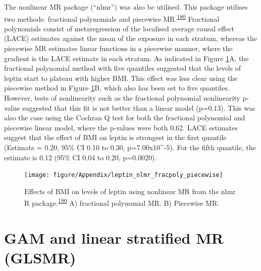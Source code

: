 \documentclass[11pt,twoside]{bristolthesis}
\begin{document}
The nonlinear MR package (``nlmr'') was also be utilised. This package utilises two methods: fractional polynomials and piecewise MR.\textsuperscript{\protect\hyperlink{ref-Staley2017}{180}} Fractional polynomials consist of metaregression of the localised average causal effect (LACE) estimates against the mean of the exposure in each stratum, whereas the piecewise MR estimates linear functions in a piecewise manner, where the gradient is the LACE estimate in each stratum. As indicated in Figure \ref{fig:leptin-nlmr}A, the fractional polynomial method with five quantiles suggested that the levels of leptin start to plateau with higher BMI. This effect was less clear using the piecewise method in Figure \ref{fig:leptin-nlmr}B, which also has been set to five quantiles. However, tests of nonlinearity such as the fractional polynomial nonlinearity p-value suggested that this fit is not better than a linear model (p=0.13). This was also the case using the Cochran Q test for both the fractional polynomial and piecewise linear model, where the p-values were both 0.62. LACE estimates suggest that the effect of BMI on leptin is strongest in the first quantile (Estimate = 0.20, 95\% CI 0.10 to 0.30, p=7.00x10\^{}-5). For the fifth quantile, the estimate is 0.12 (95\% CI 0.04 to 0.20, p=0.0020).



\begin{figure}
\texttt{[image: figure/Appendix/leptin\_nlmr\_fracpoly\_piecewise]} \caption[Effects of BMI on levels of leptin using nonlinear MR]{Effects of BMI on levels of leptin using nonlinear MR from the nlmr R package.\textsuperscript{\protect\hyperlink{ref-Staley2017}{180}} A) fractional polynomial MR. B) Piecewise MR.}\label{fig:leptin-nlmr}
\end{figure}
\hypertarget{gam-and-linear-stratified-mr-glsmr}{%
\section{GAM and linear stratified MR (GLSMR)}\label{gam-and-linear-stratified-mr-glsmr}}
\end{document}
